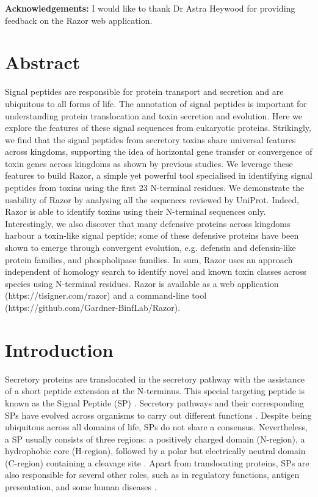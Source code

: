 \textbf{Acknowledgements:} I would like to thank Dr Astra Heywood for providing feedback on the Razor web application.\\


\section{Abstract}
Signal peptides are responsible for protein transport and secretion and are ubiquitous to all forms of life. The annotation of signal peptides is important for understanding protein translocation and toxin secretion and evolution. Here we explore the features of these signal sequences from eukaryotic proteins. Strikingly, we find that the signal peptides from secretory toxins share universal features across kingdoms, supporting the idea of horizontal gene transfer or convergence of toxin genes across kingdoms as shown by previous studies. We leverage these features to build Razor, a simple yet powerful tool specialised in identifying signal peptides from toxins using the first 23 N-terminal residues. We demonstrate the usability of Razor by analysing all the sequences reviewed by UniProt. Indeed, Razor is able to identify toxins using their N-terminal sequences only. Interestingly, we also discover that many defensive proteins across kingdoms harbour a toxin-like signal peptide; some of these defensive proteins have been shown to emerge through convergent evolution, e.g. defensin and defensin-like protein families, and phospholipase families. In sum, Razor uses an approach independent of homology search to identify novel and known toxin classes across species using N-terminal residues. Razor is available as a web application (https://tisigner.com/razor) and a command-line tool (https://github.com/Gardner-BinfLab/Razor).



\section{Introduction}
Secretory proteins are translocated in the secretory pathway with the assistance of a short peptide extension at the N-terminus. This special targeting peptide is known as the Signal Peptide (SP) \cite{Von_Heijne1990-sb}. Secretory pathways and their corresponding SPs have evolved across organisms to carry out different functions \cite{Hegde2006-od,Owji2018-hg}. Despite being ubiquitous across all domains of life, SPs do not share a consensus. Nevertheless, a SP usually consists of three regions: a positively charged domain (N-region), a hydrophobic core (H-region), followed by a polar but electrically neutral domain (C-region) containing a cleavage site \cite{Von_Heijne1985-qv,Von_Heijne1990-sb,Nielsen1998-dy}. Apart from translocating proteins, SPs are also responsible for several other roles, such as in regulatory functions, antigen presentation, and some human diseases \cite{Borrego1998-la,Datta2007-av,Owji2018-hg}.

